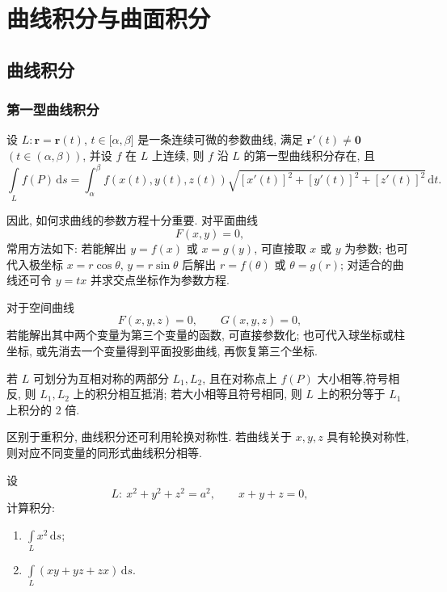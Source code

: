 \setcounter{chapter}{12}
\pagestyle{fancy}

\chapter{曲线积分与曲面积分}


\section{曲线积分}


\subsection{第一型曲线积分}

\begin{theorem}
    设 $L:\bm r=\bm r(t)$, $t\in\lbrack\alpha,\beta\rbrack$ 是一条连续可微的参数曲线, 满足 $\bm r'(t)\ne\bm0$ $(t\in(\alpha,\beta))$, 并设 $f$ 在 $L$ 上连续, 则 $f$ 沿 $L$ 的第一型曲线积分存在, 且
    \[
        \displaystyle\int\limits_L f(P)\,\mathrm{d}s
        =\int_\alpha^\beta f\left(x(t),y(t),z(t)\right)
        \sqrt{[x'(t)]^2+[y'(t)]^2+[z'(t)]^2}\,\mathrm{d}t.
    \]
\end{theorem}

因此, 如何求曲线的参数方程十分重要. 对平面曲线
\[
    F(x,y)=0,
\]
常用方法如下: 若能解出 $y=f(x)$ 或 $x=g(y)$, 可直接取 $x$ 或 $y$ 为参数; 也可代入极坐标 $x=r\cos\theta$, $y=r\sin\theta$ 后解出 $r=f(\theta)$ 或 $\theta=g(r)$; 对适合的曲线还可令 $y=tx$ 并求交点坐标作为参数方程.

对于空间曲线
\[
    F(x,y,z)=0,\qquad G(x,y,z)=0,
\]
若能解出其中两个变量为第三个变量的函数, 可直接参数化; 也可代入球坐标或柱坐标, 或先消去一个变量得到平面投影曲线, 再恢复第三个坐标.

\begin{theorem}
    若 $L$ 可划分为互相对称的两部分 $L_1,L_2$, 且在对称点上 $f(P)$ 大小相等,符号相反, 则 $L_1,L_2$ 上的积分相互抵消; 若大小相等且符号相同, 则 $L$ 上的积分等于 $L_1$ 上积分的 $2$ 倍.
\end{theorem}

\begin{remark}
    区别于重积分, 曲线积分还可利用轮换对称性. 若曲线关于 $x,y,z$ 具有轮换对称性, 则对应不同变量的同形式曲线积分相等.
\end{remark}

\begin{example}
    设
    \[
        L:\ x^2+y^2+z^2=a^2,\qquad x+y+z=0,
    \]
    计算积分:
    \begin{enumerate}
        \item $\displaystyle\int\limits_L x^2\,\mathrm{d}s$;
        \item $\displaystyle\int\limits_L(xy+yz+zx)\,\mathrm{d}s$.
    \end{enumerate}
\end{example}
\exampleblank

